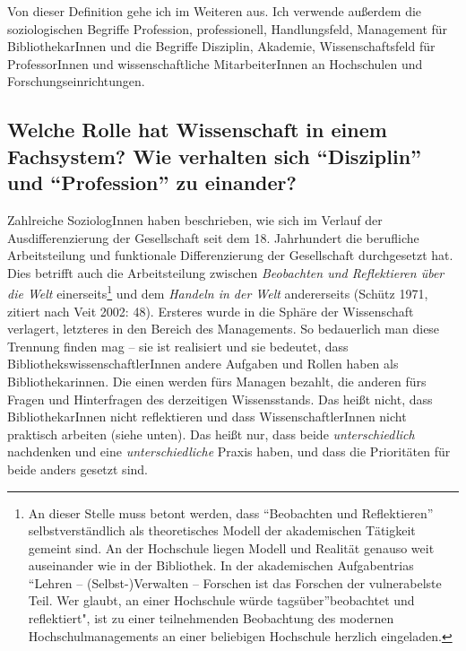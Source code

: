 \documentclass[a4paper,
fontsize=11pt,
oneside,
numbers=noperiodatend,
parskip=half-,
bibliography=totoc,
final
]{scrartcl}
\begin{document}
Von dieser Definition gehe ich im Weiteren aus. Ich verwende außerdem
die soziologischen Begriffe Profession, professionell, Handlungsfeld,
Management für BibliothekarInnen und die Begriffe Disziplin, Akademie,
Wissenschaftsfeld für ProfessorInnen und wissenschaftliche
MitarbeiterInnen an Hochschulen und Forschungseinrichtungen.

\hypertarget{welche-rolle-hat-wissenschaft-in-einem-fachsystem-wie-verhalten-sich-disziplin-und-profession-zu-einander}{%
\subsection{\texorpdfstring{Welche Rolle hat Wissenschaft in einem
Fachsystem? Wie verhalten sich \enquote{Disziplin} und
\enquote{Profession} zu
einander?}{Welche Rolle hat Wissenschaft in einem Fachsystem? Wie verhalten sich ``Disziplin'' und ``Profession'' zu einander?}}\label{welche-rolle-hat-wissenschaft-in-einem-fachsystem-wie-verhalten-sich-disziplin-und-profession-zu-einander}}

Zahlreiche SoziologInnen haben beschrieben, wie sich im Verlauf der
Ausdifferenzierung der Gesellschaft seit dem 18. Jahrhundert die
berufliche Arbeitsteilung und funktionale Differenzierung der
Gesellschaft durchgesetzt hat. Dies betrifft auch die Arbeitsteilung
zwischen \emph{Beobachten und Reflektieren über die Welt}
einerseits\footnote{An dieser Stelle muss betont werden, dass
  \enquote{Beobachten und Reflektieren} selbstverständlich als
  theoretisches Modell der akademischen Tätigkeit gemeint sind. An der
  Hochschule liegen Modell und Realität genauso weit auseinander wie in
  der Bibliothek. In der akademischen Aufgabentrias \enquote{Lehren --
  (Selbst-)Verwalten -- Forschen ist das Forschen der vulnerabelste
  Teil. Wer glaubt, an einer Hochschule würde tagsüber}beobachtet und
  reflektiert", ist zu einer teilnehmenden Beobachtung des modernen
  Hochschulmanagements an einer beliebigen Hochschule herzlich
  eingeladen.} und dem \emph{Handeln in der Welt} andererseits (Schütz
1971, zitiert nach Veit 2002: 48). Ersteres wurde in die Sphäre der
Wissenschaft verlagert, letzteres in den Bereich des Managements. So
bedauerlich man diese Trennung finden mag -- sie ist realisiert und sie
bedeutet, dass BibliothekswissenschaftlerInnen andere Aufgaben und
Rollen haben als Bibliothekarinnen. Die einen werden fürs Managen
bezahlt, die anderen fürs Fragen und Hinterfragen des derzeitigen
Wissensstands. Das heißt nicht, dass BibliothekarInnen nicht
reflektieren und dass WissenschaftlerInnen nicht praktisch arbeiten
(siehe unten). Das heißt nur, dass beide \emph{unterschiedlich}
nachdenken und eine \emph{unterschiedliche} Praxis haben, und dass die
Prioritäten für beide anders gesetzt sind.
\end{document}
